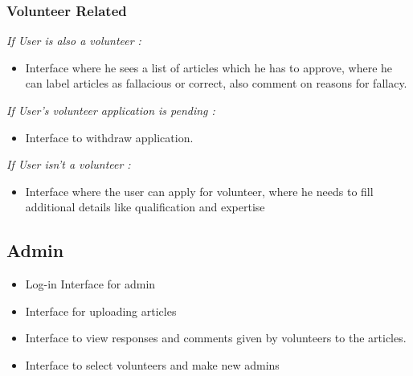 \documentclass[titlepage,12pt]{article}
\begin{document}
\subsubsection{ Volunteer Related }
        \noindent
        \textit{ If User is also a volunteer : }
        \begin{itemize}
             \setlength\itemsep{0.3em}
            \item Interface where he sees a list of articles which he has to approve, where he can label articles as fallacious or correct, also comment on reasons for fallacy.
        \end{itemize}
        \noindent
        \textit{ If User's volunteer application is pending : }
        \begin{itemize}
            \item Interface to withdraw application.
        \end{itemize}
        \newpage
        \noindent
        \textit{ If User isn't a volunteer : }
        \begin{itemize}
             \setlength\itemsep{0.3em}
            \item Interface where the user can apply for volunteer, where he needs to fill additional details like qualification and expertise
        \end{itemize}
\subsection{Admin}
\begin{itemize}
     \setlength\itemsep{0.3em}
    \item Log-in Interface for admin 
    \item Interface for uploading articles
    \item  Interface to view responses and comments given by volunteers to the articles.
    \item Interface to select volunteers and make new admins
\end{itemize}
\end{document}
